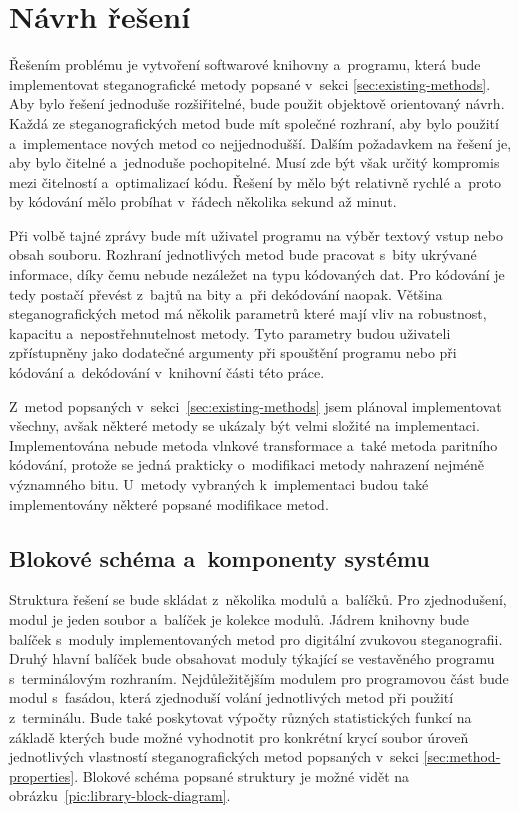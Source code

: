 \section{Návrh řešení}
\label{sec:solution-proposal}

Řešením problému je vytvoření softwarové knihovny a~programu, která bude
implementovat steganografické metody popsané v~sekci
\ref{sec:existing-methods}. Aby bylo řešení jednoduše rozšiřitelné, bude použit
objektově orientovaný návrh. Každá ze steganografických metod bude mít společné
rozhraní, aby bylo použití a~implementace nových metod co nejjednodušší. Dalším
požadavkem na řešení je, aby bylo čitelné a~jednoduše pochopitelné. Musí zde
být však určitý kompromis mezi čitelností a~optimalizací kódu. Řešení by mělo
být relativně rychlé a~proto by kódování mělo probíhat v~řádech několika sekund
až minut.

Při volbě tajné zprávy bude mít uživatel programu na výběr textový vstup nebo
obsah souboru. Rozhraní jednotlivých metod bude pracovat s~bity ukrývané
informace, díky čemu nebude nezáležet na typu kódovaných dat. Pro kódování je
tedy postačí převést z~bajtů na bity a~při dekódování naopak. Většina
steganografických metod má několik parametrů které mají vliv na robustnost,
kapacitu a~nepostřehnutelnost metody. Tyto parametry budou uživateli
zpřístupněny jako dodatečné argumenty při spouštění programu nebo při kódování
a~dekódování v~knihovní části této práce.

Z~metod popsaných v~sekci~\ref{sec:existing-methods} jsem plánoval
implementovat všechny, avšak některé metody se ukázaly být velmi složité na
implementaci. Implementována nebude metoda vlnkové transformace a~také metoda
paritního kódování, protože se jedná prakticky o~modifikaci metody nahrazení
nejméně významného bitu. U~metody vybraných k~implementaci budou také
implementovány některé popsané modifikace metod.

\subsection*{Blokové schéma a~komponenty systému}
\label{sub:solution-components}

Struktura řešení se bude skládat z~několika modulů a~balíčků. Pro zjednodušení,
modul je jeden soubor a~balíček je kolekce modulů. Jádrem knihovny bude balíček
s~moduly implementovaných metod pro digitální zvukovou steganografii. Druhý
hlavní balíček bude obsahovat moduly týkající se vestavěného programu
s~terminálovým rozhraním. Nejdůležitějším modulem pro programovou část bude
modul s~fasádou, která zjednoduší volání jednotlivých metod při použití
z~terminálu. Bude také poskytovat výpočty různých statistických funkcí na
základě kterých bude možné vyhodnotit pro konkrétní krycí soubor úroveň
jednotlivých vlastností steganografických metod popsaných v~sekci
\ref{sec:method-properties}. Blokové schéma popsané struktury je možné vidět na
obrázku~\ref{pic:library-block-diagram}.

